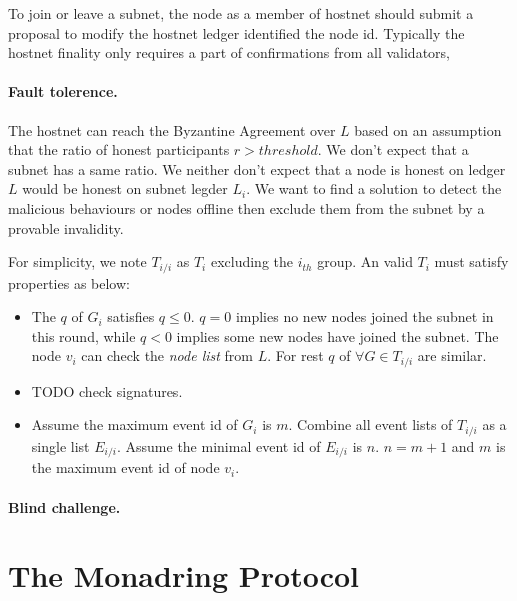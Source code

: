 \documentclass[11pt]{article}
\begin{document}
To join or leave a subnet, the node as a member of hostnet should submit a proposal to modify the hostnet ledger identified the node id.
Typically the hostnet finality only requires a part of confirmations from all validators\cite{granpd},

\paragraph{Fault tolerence.}
The hostnet can reach the Byzantine Agreement over $L$ based on an assumption that the ratio of honest participants $r > threshold$.
We don{'}t expect that a subnet has a same ratio. We neither don{'}t expect that a node is honest on ledger $L$ would be honest on subnet legder $L_{i}$.
We want to find a solution to detect the malicious behaviours or nodes offline then exclude them from the subnet by a provable invalidity.

For simplicity, we note $T_{i/i}$ as $T_{i}$ excluding the $i_{th}$ group. An valid $T_{i}$ must satisfy properties as below:

\begin{itemize}
\item The $q$ of $G_{i}$ satisfies \(q \leq 0\). $q=0$ implies no new nodes joined the subnet in this round, while $q < 0$ implies some new nodes have joined the subnet. The node $v_{i}$ can check the \textit{node list} from $L$.
For rest $q$ of $\forall G \in T_{i/i}$ are similar.
\item TODO check signatures.
\item Assume the maximum event id of $G_{i}$ is $m$. Combine all event lists of $T_{i/i}$ as a single list $E_{i/i}$. Assume the minimal event id of $E_{i/i}$ is $n$.
\(n = m+1\) and $m$ is the maximum event id of node $v_{i}$.
\end{itemize}


\paragraph{Blind challenge.} %

\section{The Monadring Protocol}
\end{document}

